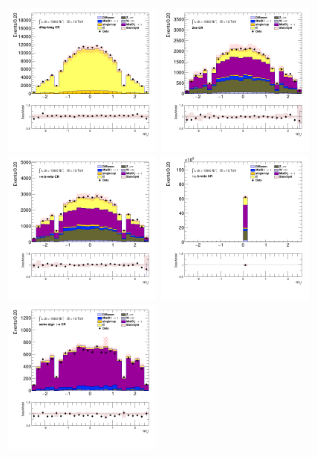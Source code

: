 		\begin{figure}[!htp]
			\begin{center}    
			\includegraphics[width=0.35\textwidth]{chapters/chapter6_HPlus/images/taulep/el_0_eta_DILEP_BTAG.png}
			\includegraphics[width=0.35\textwidth]{chapters/chapter6_HPlus/images/taulep/el_0_eta_ZEE.png} \\
			\includegraphics[width=0.35\textwidth]{chapters/chapter6_HPlus/images/taulep/el_0_eta_TAUEL_BVETO.png} 
			\includegraphics[width=0.35\textwidth]{chapters/chapter6_HPlus/images/taulep/el_0_eta_TAUMU_BVETO.png} \\
			\includegraphics[width=0.35\textwidth]{chapters/chapter6_HPlus/images/taulep/el_0_eta_SS_TAUEL.png} 

\end{center}
\end{figure}
